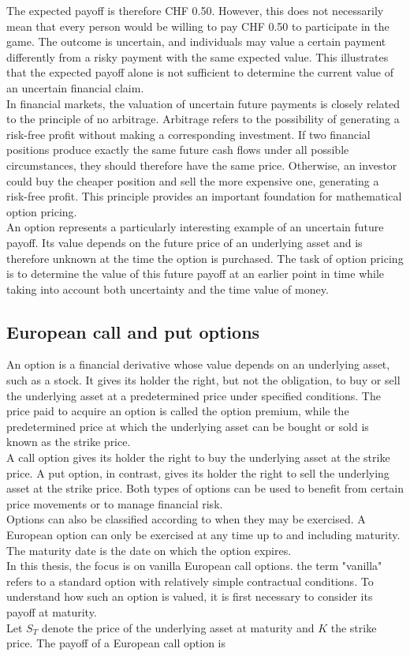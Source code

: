 \documentclass{article}
\begin{document}
	The expected payoff is therefore CHF 0.50. However, this does not necessarily mean that every person would be willing to pay CHF 0.50 to participate in the game. The outcome is uncertain, and individuals may value a certain payment differently from a risky payment with the same expected value. This illustrates that the expected payoff alone is not sufficient to determine the current value of an uncertain financial claim.\\
	In financial markets, the valuation of uncertain future payments is closely related to the principle of no arbitrage. Arbitrage refers to the possibility of generating a risk-free profit without making a corresponding investment. If two financial positions produce exactly the same future cash flows under all possible circumstances, they should therefore have the same price. Otherwise, an investor could buy the cheaper position and sell the more expensive one, generating a risk-free profit. This principle provides an important foundation for mathematical option pricing.\\
	An option represents a particularly interesting example of an uncertain future payoff. Its value depends on the future price of an underlying asset and is therefore unknown at the time the option is purchased. The task of option pricing is to determine the value of this future payoff at an earlier point in time while taking into account both uncertainty and the time value of money.
	
	\subsection{European call and put options}
	
	An option is a financial derivative whose value depends on an underlying asset, such as a stock. It gives its holder the right, but not the obligation, to buy or sell the underlying asset at a predetermined price under specified conditions. The price paid to acquire an option is called the option premium, while the predetermined price at which the underlying asset can be bought or sold is known as the strike price.\\
	A call option gives its holder the right to buy the underlying asset at the strike price. A put option, in contrast, gives its holder the right to sell the underlying asset at the strike price. Both types of options can be used to benefit from certain price movements or to manage financial risk.\\
	Options can also be classified according to when they may be exercised. A European option can only be exercised at any time up to and including maturity. The maturity date is the date on which the option expires.\\
	In this thesis, the focus is on vanilla European call options. the term "vanilla" refers to a standard option with relatively simple contractual conditions. To understand how such an option is valued, it is first necessary to consider its payoff at maturity. \\
	Let $S_T$ denote the price of the underlying asset at maturity and $K$ the strike price. The payoff of a European call option is
	
\end{document}

